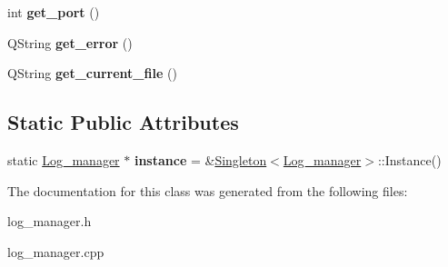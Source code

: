 \begin{DoxyCompactItemize}
\item 
\hypertarget{class_log__viewer_1_1_log__manager_a0fef80e0e439fab3a445cb53a490764f}{int {\bfseries get\-\_\-port} ()}\label{class_log__viewer_1_1_log__manager_a0fef80e0e439fab3a445cb53a490764f}

\item 
\hypertarget{class_log__viewer_1_1_log__manager_a6d5a74cbe0295491727a1129c3b50233}{Q\-String {\bfseries get\-\_\-error} ()}\label{class_log__viewer_1_1_log__manager_a6d5a74cbe0295491727a1129c3b50233}

\item 
\hypertarget{class_log__viewer_1_1_log__manager_a5be7c479f5f3acb3ce3739b24200e3a2}{Q\-String {\bfseries get\-\_\-current\-\_\-file} ()}\label{class_log__viewer_1_1_log__manager_a5be7c479f5f3acb3ce3739b24200e3a2}

\end{DoxyCompactItemize}
\subsection*{Static Public Attributes}
\begin{DoxyCompactItemize}
\item 
\hypertarget{class_log__viewer_1_1_log__manager_a7160fd218229d2b36bb3591c978e2eee}{static \hyperlink{class_log__viewer_1_1_log__manager}{Log\-\_\-manager} $\ast$ {\bfseries instance} = \&\hyperlink{class_singleton}{Singleton}$<$\hyperlink{class_log__viewer_1_1_log__manager}{Log\-\_\-manager}$>$\-::Instance()}\label{class_log__viewer_1_1_log__manager_a7160fd218229d2b36bb3591c978e2eee}

\end{DoxyCompactItemize}


The documentation for this class was generated from the following files\-:\begin{DoxyCompactItemize}
\item 
log\-\_\-manager.\-h\item 
log\-\_\-manager.\-cpp\end{DoxyCompactItemize}
